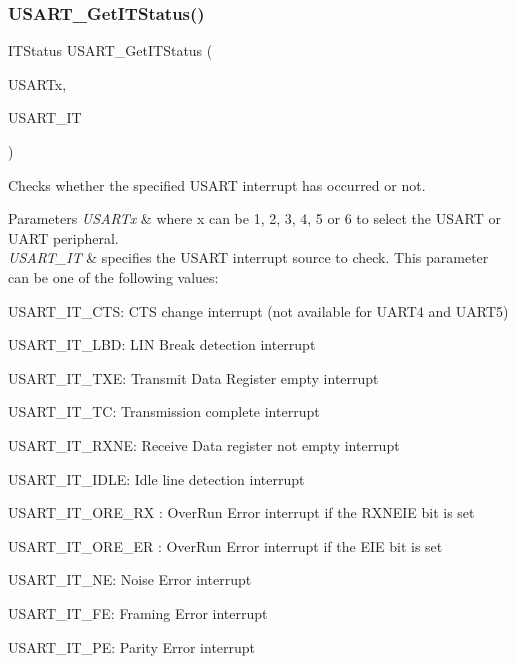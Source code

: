 \subsubsection{\texorpdfstring{U\+S\+A\+R\+T\+\_\+\+Get\+I\+T\+Status()}{USART\_GetITStatus()}}
{\footnotesize\ttfamily I\+T\+Status U\+S\+A\+R\+T\+\_\+\+Get\+I\+T\+Status (\begin{DoxyParamCaption}\item[{\hyperlink{struct_u_s_a_r_t___type_def}{U\+S\+A\+R\+T\+\_\+\+Type\+Def} $\ast$}]{U\+S\+A\+R\+Tx,  }\item[{uint16\+\_\+t}]{U\+S\+A\+R\+T\+\_\+\+IT }\end{DoxyParamCaption})}



Checks whether the specified U\+S\+A\+RT interrupt has occurred or not. 


\begin{DoxyParams}{Parameters}
{\em U\+S\+A\+R\+Tx} & where x can be 1, 2, 3, 4, 5 or 6 to select the U\+S\+A\+RT or U\+A\+RT peripheral. \\
\hline
{\em U\+S\+A\+R\+T\+\_\+\+IT} & specifies the U\+S\+A\+RT interrupt source to check. This parameter can be one of the following values\+: \begin{DoxyItemize}
\item U\+S\+A\+R\+T\+\_\+\+I\+T\+\_\+\+C\+TS\+: C\+TS change interrupt (not available for U\+A\+R\+T4 and U\+A\+R\+T5) \item U\+S\+A\+R\+T\+\_\+\+I\+T\+\_\+\+L\+BD\+: L\+IN Break detection interrupt \item U\+S\+A\+R\+T\+\_\+\+I\+T\+\_\+\+T\+XE\+: Transmit Data Register empty interrupt \item U\+S\+A\+R\+T\+\_\+\+I\+T\+\_\+\+TC\+: Transmission complete interrupt \item U\+S\+A\+R\+T\+\_\+\+I\+T\+\_\+\+R\+X\+NE\+: Receive Data register not empty interrupt \item U\+S\+A\+R\+T\+\_\+\+I\+T\+\_\+\+I\+D\+LE\+: Idle line detection interrupt \item U\+S\+A\+R\+T\+\_\+\+I\+T\+\_\+\+O\+R\+E\+\_\+\+RX \+: Over\+Run Error interrupt if the R\+X\+N\+E\+IE bit is set \item U\+S\+A\+R\+T\+\_\+\+I\+T\+\_\+\+O\+R\+E\+\_\+\+ER \+: Over\+Run Error interrupt if the E\+IE bit is set \item U\+S\+A\+R\+T\+\_\+\+I\+T\+\_\+\+NE\+: Noise Error interrupt \item U\+S\+A\+R\+T\+\_\+\+I\+T\+\_\+\+FE\+: Framing Error interrupt \item U\+S\+A\+R\+T\+\_\+\+I\+T\+\_\+\+PE\+: Parity Error interrupt \end{DoxyItemize}
\\
\hline
\end{DoxyParams}

